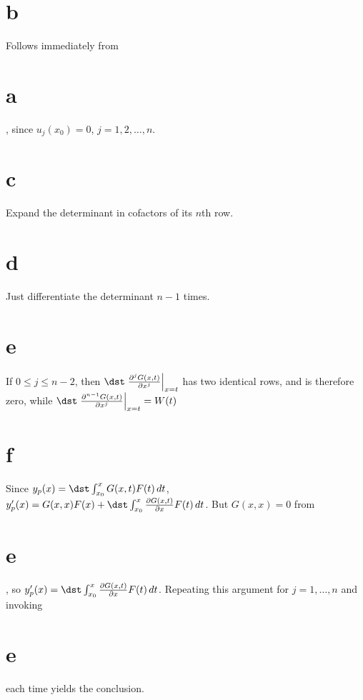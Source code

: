 \documentclass[dvips]{book}
\numberwithin{example}{section}
\numberwithin{equation}{section}
\numberwithin{theorem}{section}
\numberwithin{table}{section}
\numberwithin{figure}{section}
\begin{document}
\part{b} Follows immediately from \part{a}, since $u_j(x_0)=0$,
$j=1,2,\dots,n$.

\part{c} Expand the determinant in cofactors of its $n$th row.


\part{d} Just differentiate the determinant $n-1$ times.

\part{e} If $0\le j\le n-2$, then
$\dst\left.{\partial^{j}G(x,t)\over\partial x^j}\right|_{x=t}$
has two identical rows, and is therefore zero, while
$\dst\left.{\partial^{n-1}G(x,t)\over\partial x^j}\right|_{x=t}=W(t)$

\part{f} Since
$y_p(x)=\dst\int_{x_0}^x G(x,t)F(t)\,dt$,
$y_p'(x)=G(x,x)F(x)+\dst\int_{x_0}^x{\partial
G(x,t)\over\partial x}F(t)\,dt$. But $G(x,x)=0$ from \part{e}, so
$y_p'(x)=\dst\int_{x_0}^x{\partial
G(x,t)\over\partial x}F(t)\,dt$. Repeating this argument for
$j=1,\dots,n$ and invoking \part{e} each time yields the conclusion.
\end{document}
